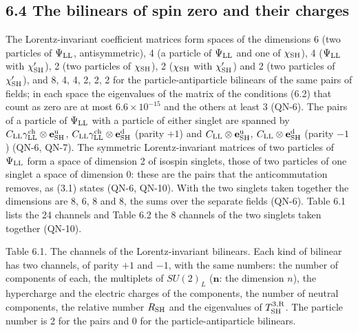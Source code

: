 \documentclass[
  10pt,
]{article}
\begin{document}
\hypertarget{the-bilinears-of-spin-zero-and-their-charges}{%
\subsection{6.4 The bilinears of spin zero and their
charges}\label{the-bilinears-of-spin-zero-and-their-charges}}

The Lorentz-invariant coefficient matrices form spaces of the dimensions
6 (two particles of \(\Psi_{\rm LL}\), antisymmetric), 4 (a particle of
\(\Psi_{\rm LL}\) and one of \(\chi_{\rm SH}\)), 4 (\(\Psi_{\rm LL}\)
with \(\chi'_{\rm SH}\)), 2 (two particles of \(\chi_{\rm SH}\)), 2
(\(\chi_{\rm SH}\) with \(\chi'_{\rm SH}\)) and 2 (two particles of
\(\chi'_{\rm SH}\)), and 8, 4, 4, 2, 2, 2 for the particle-antiparticle
bilinears of the same pairs of fields; in each space the eigenvalues of
the matrix of the conditions (6.2) that count as zero are at most
\(6.6\times10^{-15}\) and the others at least \(3\) (QN-6). The pairs of
a particle of \(\Psi_{\rm LL}\) with a particle of either singlet are
spanned by
\(C_{\rm LL}\gamma^{\rm ch}_{\rm LL}\otimes\mathbf e^{\rm u}_{\rm SH}\),
\(C_{\rm LL}\gamma^{\rm ch}_{\rm LL}\otimes\mathbf e^{\rm d}_{\rm SH}\)
(parity \(+1\)) and \(C_{\rm LL}\otimes\mathbf e^{\rm u}_{\rm SH}\),
\(C_{\rm LL}\otimes\mathbf e^{\rm d}_{\rm SH}\) (parity \(-1\)) (QN-6,
QN-7). The symmetric Lorentz-invariant matrices of two particles of
\(\Psi_{\rm LL}\) form a space of dimension 2 of isospin singlets, those
of two particles of one singlet a space of dimension 0: these are the
pairs that the anticommutation removes, as (3.1) states (QN-6, QN-10).
With the two singlets taken together the dimensions are 8, 6, 8 and 8,
the sums over the separate fields (QN-6). Table 6.1 lists the 24
channels and Table 6.2 the 8 channels of the two singlets taken together
(QN-10).

Table 6.1. The channels of the Lorentz-invariant bilinears. Each kind of
bilinear has two channels, of parity \(+1\) and \(-1\), with the same
numbers: the number of components of each, the multiplets of \(SU(2)_L\)
(\(\mathbf n\): the dimension \(n\)), the hypercharge and the electric
charges of the components, the number of neutral components, the
relative number \(R_{\rm SH}\) and the eigenvalues of
\(T^{3,{\rm R}}_{\rm SH}\). The particle number is 2 for the pairs and 0
for the particle-antiparticle bilinears.
\end{document}
